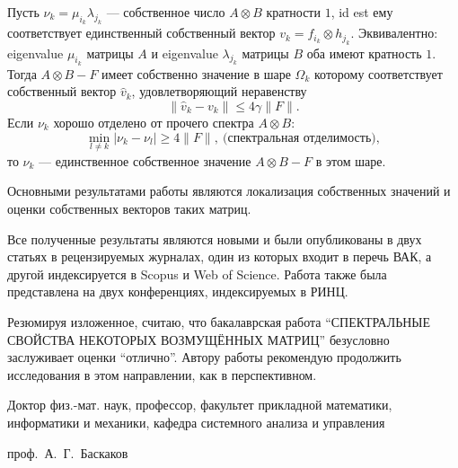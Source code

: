     Пусть \( \nu_k=\mu_{i_k}\lambda_{j_k} \) --- собственное число \( A{\otimes}B \) кратности \( 1 \),
        id est ему соответствует единственный собственный вектор \( v_k = f_{i_k}{\otimes}h_{j_k} \).
    Эквивалентно: eigenvalue \( \mu_{i_k} \)
        матрицы \( A \) и eigenvalue \( \lambda_{j_k} \) матрицы \( B \)
        оба имеют кратность \( 1 \).
    Тогда \( A{\otimes}B - F \) имеет собственно значение в шаре \( \Omega_k \)
        которому соответствует собственный вектор \( \hat{v}_k \),
        удовлетворяющий неравенству
    \[
        \|\hat{v}_k - v_k\| \leq 4\gamma \|F\|.
    \]
    Если \( \nu_k \) хорошо отделено от прочего спектра \( A{\otimes}B \):
    \[
        \min_{l\neq k}
        \lvert
        \nu_k - \nu_l
        \rvert
        \geq 4\|F\|,\ \text{(спектральная отделимость)},
    \]
    то \( \nu_k \) --- единственное собственное значение \( A{\otimes}B - F \)
    в этом шаре.

Основными результатами работы являются локализация собственных значений и оценки
собственных векторов таких матриц.

Все полученные результаты являются новыми и были опубликованы в двух статьях в
рецензируемых журналах, один из которых входит в перечь ВАК, а другой
индексируется в Scopus и Web of Science. Работа также была представлена на двух
конференциях, индексируемых в РИНЦ.

Резюмируя изложенное, считаю, что бакалаврская работа
``СПЕКТРАЛЬНЫЕ СВОЙСТВА НЕКОТОРЫХ ВОЗМУЩЁННЫХ МАТРИЦ''
безусловно заслуживает оценки ``отлично''.
Автору работы рекомендую продолжить исследования в этом направлении, как в
перспективном.

\vfill
\begin{minipage}{12em}
Доктор физ.-мат. наук, профессор,
факультет прикладной математики, информатики и механики,
кафедра системного анализа и управления
\end{minipage}
\hfill
проф.~А.~Г.~Баскаков
